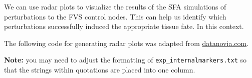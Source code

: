 \documentclass[
]{book}
\newenvironment{Shaded}{\begin{snugshade}}{\end{snugshade}}
\newcommand{\CommentTok}[1]{\textcolor[rgb]{0.56,0.35,0.01}{\textit{#1}}}
\newcommand{\ControlFlowTok}[1]{\textcolor[rgb]{0.13,0.29,0.53}{\textbf{#1}}}
\newcommand{\DataTypeTok}[1]{\textcolor[rgb]{0.13,0.29,0.53}{#1}}
\newcommand{\DecValTok}[1]{\textcolor[rgb]{0.00,0.00,0.81}{#1}}
\newcommand{\FloatTok}[1]{\textcolor[rgb]{0.00,0.00,0.81}{#1}}
\newcommand{\KeywordTok}[1]{\textcolor[rgb]{0.13,0.29,0.53}{\textbf{#1}}}
\newcommand{\NormalTok}[1]{#1}
\newcommand{\OperatorTok}[1]{\textcolor[rgb]{0.81,0.36,0.00}{\textbf{#1}}}
\newcommand{\OtherTok}[1]{\textcolor[rgb]{0.56,0.35,0.01}{#1}}
\newcommand{\StringTok}[1]{\textcolor[rgb]{0.31,0.60,0.02}{#1}}
\begin{document}
We can use radar plots to visualize the results of the SFA simulations of perturbations to the FVS control nodes. This can help us identify which perturbations successfully induced the appropriate tissue fate. In this context.

The following code for generating radar plots was adapted from \href{https://www.google.com/search?q=create+_beautiful_+radar+chart\&oq=create+beautiful+rada\&aqs=chrome.1.69i57j0i10i22i30.11973j0j1\&sourceid=chrome\&ie=UTF-8}{datanovia.com}.

\textbf{Note: } you may need to adjust the formatting of \texttt{exp\_internalmarkers.txt} so that the strings within quotations are placed into one column.

\begin{Shaded}
\end{Shaded}
\end{document}
